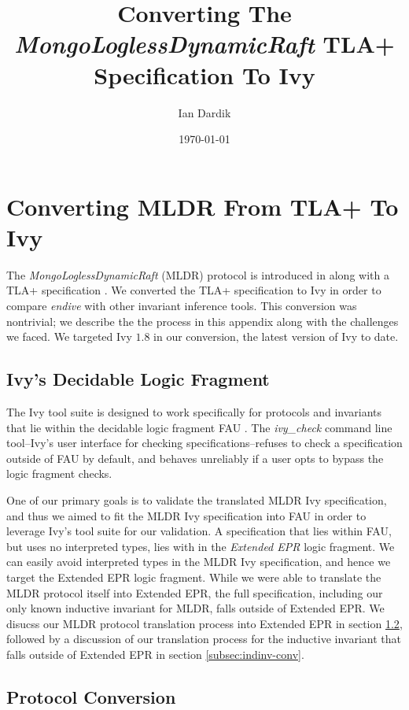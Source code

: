 \documentclass[runningheads]{llncs}
\title{Converting The \textit{MongoLoglessDynamicRaft} TLA+ Specification To Ivy}
\author{Ian Dardik}
\institute{Northeastern University}
\date{\today}
\begin{document}
\maketitle


\section{Converting MLDR From TLA+ To Ivy}

The \textit{MongoLoglessDynamicRaft} (MLDR) protocol is introduced in \cite{schultz2021design} along with a TLA+ specification \cite{zenodo-tla-specs}.  We converted the TLA+ specification to Ivy in order to compare \textit{endive} with other invariant inference tools.  This conversion was nontrivial; we describe the the process in this appendix along with the challenges we faced.  We targeted Ivy $1.8$ in our conversion, the latest version of Ivy to date.


\subsection{Ivy's Decidable Logic Fragment}

The Ivy tool suite is designed to work specifically for protocols and invariants that lie within the decidable logic fragment FAU \cite{Ge2009Complete}.  The \textit{ivy\_check} command line tool--Ivy's user interface for checking specifications--refuses to check a specification outside of FAU by default, and behaves unreliably if a user opts to bypass the logic fragment checks.

One of our primary goals is to validate the translated MLDR Ivy specification, and thus we aimed to fit the MLDR Ivy specification into FAU in order to leverage Ivy's tool suite for our validation.  A specification that lies within FAU, but uses no interpreted types, lies with in the \textit{Extended EPR} \cite{padonpaxosEPR} logic fragment.  We can easily avoid interpreted types in the MLDR Ivy specification, and hence we target the Extended EPR logic fragment.  While we were able to translate the MLDR protocol itself into Extended EPR, the full specification, including our only known inductive invariant for MLDR, falls outside of Extended EPR.  We disucss our MLDR protocol translation process into Extended EPR in section \ref{subsec:protocol-conv}, followed by a discussion of our translation process for the inductive invariant that falls outside of Extended EPR in section \ref{subsec:indinv-conv}.


\subsection{Protocol Conversion}
\label{subsec:protocol-conv}
\end{document}
